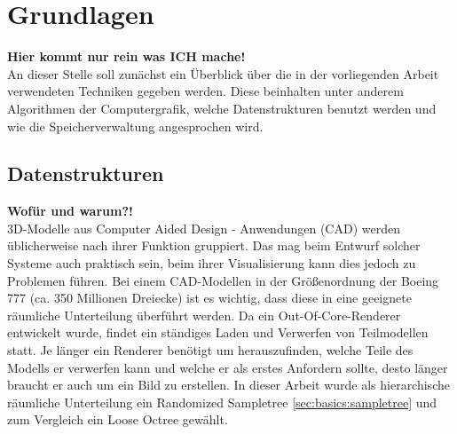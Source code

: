 \chapter{Grundlagen}
\label{chap:basics}
%
\textbf{Hier kommt nur rein was ICH mache!}\\
An dieser Stelle soll zunächst ein Überblick über die in der vorliegenden Arbeit verwendeten Techniken gegeben werden. Diese beinhalten unter anderem Algorithmen der Computergrafik, welche Datenstrukturen benutzt werden und wie die Speicherverwaltung angesprochen wird.

\section{Datenstrukturen}
\label{sec:basics:datenstrukturen}
\textbf{Wofür und warum?!}\\
3D-Modelle aus Computer Aided Design - Anwendungen (CAD) werden üblicherweise nach ihrer Funktion gruppiert. Das mag beim Entwurf solcher Systeme auch praktisch sein, beim ihrer Visualisierung kann dies jedoch zu Problemen führen. 
%
Bei einem CAD-Modellen in der Größenordnung der Boeing 777 (ca. 350 Millionen Dreiecke) ist es wichtig, dass diese in eine geeignete räumliche Unterteilung überführt werden. Da ein Out-Of-Core-Renderer entwickelt wurde, findet ein ständiges Laden und Verwerfen von Teilmodellen statt. Je länger ein Renderer benötigt um herauszufinden, welche Teile des Modells er verwerfen kann und welche er als erstes Anfordern sollte, desto länger braucht er auch um ein Bild zu erstellen. In dieser Arbeit wurde als hierarchische räumliche Unterteilung ein Randomized Sampletree \ref{sec:basics:sampletree} und zum Vergleich ein Loose Octree gewählt.

